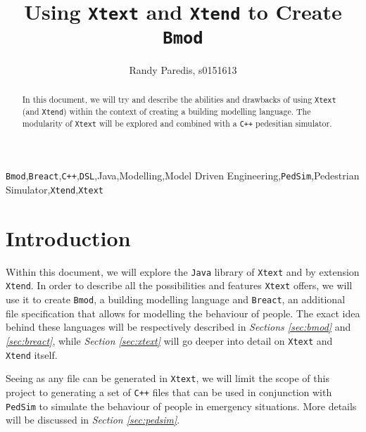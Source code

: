 \documentclass[review]{elsarticle}
\begin{document}
\begin{frontmatter}

\title{Using \texttt{Xtext} and \texttt{Xtend} to Create \texttt{Bmod}}

\author{Randy Paredis, s0151613}
\address{\small{randy.paredis@student.uantwerpen.be}\\Master in Computer Science, University of Antwerp}

\begin{abstract}
In this document, we will try and describe the abilities and drawbacks of using \texttt{Xtext} (and \texttt{Xtend}) within the context of creating a building modelling language. The modularity of \texttt{Xtext} will be explored and combined with a \texttt{C++} pedesitian simulator.
\end{abstract}

\begin{keyword}
\texttt{Bmod}\sep\texttt{Breact}\sep\texttt{C++}\sep\texttt{DSL}\sep\textsf{Java}\sep Modelling\sep Model Driven Engineering\sep\texttt{PedSim}\sep Pedestrian Simulator\sep\texttt{Xtend}\sep\texttt{Xtext}
\end{keyword}

\end{frontmatter}

\linenumbers

\section{Introduction}
Within this document, we will explore the \texttt{Java} library of \texttt{Xtext} \cite{xtext} and by extension \texttt{Xtend}. In order to describe all the possibilities and features \texttt{Xtext} offers, we will use it to create \texttt{Bmod}, a building modelling language and \texttt{Breact}, an additional file specification that allows for modelling the behaviour of people. The exact idea behind these languages will be respectively described in \textsl{Sections \ref{sec:bmod}} and \textsl{\ref{sec:breact}}, while \textsl{Section \ref{sec:xtext}} will go deeper into detail on \texttt{Xtext} and \texttt{Xtend} itself. 

Seeing as any file can be generated in \texttt{Xtext}, we will limit the scope of this project to generating a set of \texttt{C++} files that can be used in conjunction with \texttt{PedSim}\cite{pedsim} to simulate the behaviour of people in emergency situations. More details will be discussed in \textsl{Section \ref{sec:pedsim}}.
\end{document}
